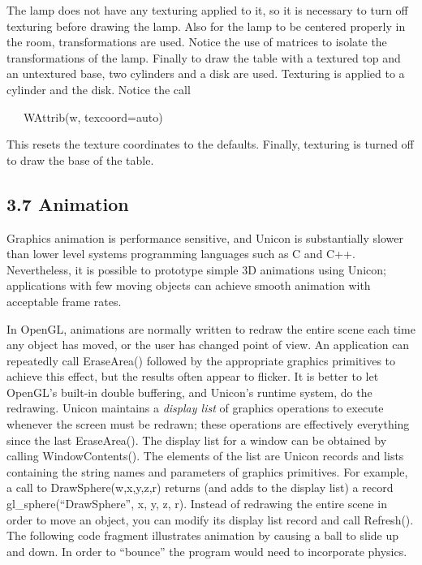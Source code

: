 \documentclass[letterpaper]{article}
\begin{document}
{{
The lamp does not have any texturing applied to it, so it is necessary to turn off texturing before drawing the lamp.
Also for the lamp to be centered properly in the room, transformations are used. Notice the use of matrices to isolate
the transformations of the lamp. Finally to draw the table with a textured top and an untextured base, two cylinders
and a disk are used. Texturing is applied to a cylinder and the disk. Notice the call }

{
\ \ \ \textsf{WAttrib(w, {\textquotedbl}texcoord=auto{\textquotedbl})}}

{
This resets the texture coordinates to the defaults. Finally, texturing is turned off to draw the base of the table.}


\subsection[3.7 Animation]{3.7 Animation}

Graphics animation is performance sensitive, and Unicon is
substantially slower than lower level systems programming languages
such as C and C++. Nevertheless, it is possible to prototype simple 3D
animations using Unicon; applications with few moving objects can
achieve smooth animation with acceptable frame rates.

{
In OpenGL, animations are normally written to redraw the entire scene each time any object has moved, or the user has
changed point of view. An application can repeatedly call EraseArea() followed by the appropriate graphics primitives
to achieve this effect, but the results often appear to flicker. It is better to let OpenGL's built-in double
buffering, and Unicon's runtime system, do the redrawing. Unicon maintains a \textit{display list} of graphics
operations to execute whenever the screen must be redrawn; these operations are effectively everything since the last
EraseArea(). The display list for a window can be obtained by calling WindowContents(). The elements of the list are
Unicon records and lists containing the string names and parameters of graphics primitives. For example, a call to
DrawSphere(w,x,y,z,r) returns (and adds to the display list) a record gl\_sphere(``DrawSphere'', x, y, z, r). Instead
of redrawing the entire scene in order to move an object, you can modify its display list record and call Refresh().
The following code fragment illustrates animation by causing a ball to slide up and down. In order to ``bounce'' the
program would need to incorporate physics. }

}
\end{document}
